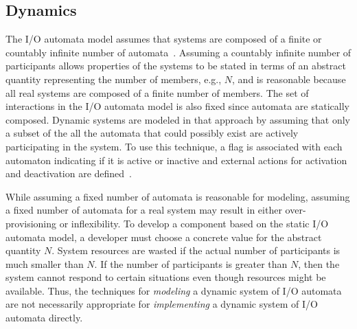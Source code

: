 

\subsection{Dynamics\label{dynamics}}

The I/O automata model assumes that systems are composed of a finite or countably infinite number of automata~\cite{lynch1996distributed}.
Assuming a countably infinite number of participants allows properties of the systems to be stated in terms of an abstract quantity representing the number of members, e.g., $N$, and is reasonable because all real systems are composed of a finite number of members.
The set of interactions in the I/O automata model is also fixed since automata are statically composed.
Dynamic systems are modeled in that approach by assuming that only a subset of the all the automata that could possibly exist are actively participating in the system.
To use this technique, a flag is associated with each automaton indicating if it is active or inactive and external actions for activation and deactivation are defined~\cite{lynch1994atomic}.

While assuming a fixed number of automata is reasonable for modeling, assuming a fixed number of automata for a real system may result in either over-provisioning or inflexibility.
To develop a component based on the static I/O automata model, a developer must choose a concrete value for the abstract quantity $N$.
System resources are wasted if the actual number of participants is much smaller than $N$.
If the number of participants is greater than $N$, then the system cannot respond to certain situations even though resources might be available.
Thus, the techniques for \emph{modeling} a dynamic system of I/O automata are not necessarily appropriate for \emph{implementing} a dynamic system of I/O automata directly.

